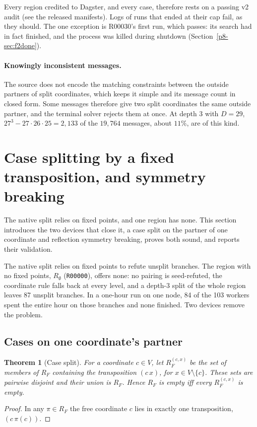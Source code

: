\documentclass[11pt,a4paper,oneside]{report}
\newtheorem{theorem}{Theorem}[chapter]
\theoremstyle{definition}
\newcommand{\code}[1]{\texttt{#1}}
\begin{document}
Every region credited to Dagster, and every case, therefore rests on a passing v2 audit
(see the released manifests).
Logs of runs that ended at their cap fail, as they should. The one exception is R00030's first
run, which passes: its search had in fact finished, and the process was killed during shutdown
(Section~\ref{p8-sec:f2done}).



\paragraph{Knowingly inconsistent messages.} The source does not encode the matching constraints
between the outside partners of split coordinates, which keeps it simple and its message count in
closed form. Some messages therefore give two split coordinates the same outside partner, and the
terminal solver rejects them at once. At depth 3 with $D=29$, $27^3-27\cdot26\cdot25=2{,}133$ of the
$19{,}764$ messages, about $11\%$, are of this kind.

\section{Case splitting by a fixed transposition, and symmetry breaking}\label{p8-sec:cases}
The native split relies on fixed points, and one region has none. This section introduces the two devices that close it, a case split on the partner of one coordinate and reflection symmetry breaking, proves both sound, and reports their validation.


The native split relies on fixed points to refute unsplit branches. The region with no fixed
points, $R_\emptyset$ (\code{R00000}), offers none: no pairing is seed-refuted, the coordinate
rule falls back at every level, and a depth-3 split of the whole region leaves 87 unsplit
branches. In a one-hour run on one node, 84 of the 103 workers spent the entire hour on those
branches and none finished. Two devices remove the problem.

\subsection{Cases on one coordinate's partner}

\begin{theorem}[Case split]\label{p8-thm:case}
For a coordinate $c\in V$, let $R_F^{(c,x)}$ be the set of members of $R_F$ containing the
transposition $(c\,x)$, for $x\in V\setminus\{c\}$. These sets are pairwise disjoint and their
union is $R_F$. Hence $R_F$ is empty iff every $R_F^{(c,x)}$ is empty.
\end{theorem}
\begin{proof}
In any $\pi\in R_F$ the free coordinate $c$ lies in exactly one transposition, $(c\,\pi(c))$.
\end{proof}
\end{document}
